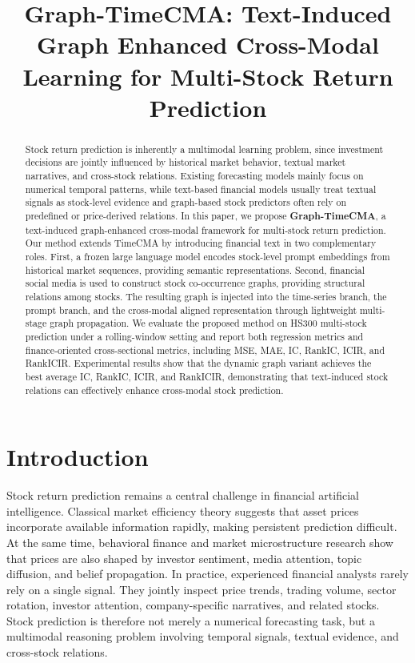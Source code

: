 \title{Graph-TimeCMA: Text-Induced Graph Enhanced Cross-Modal Learning for Multi-Stock Return Prediction}

\begin{abstract}
Stock return prediction is inherently a multimodal learning problem, since investment decisions are jointly influenced by historical market behavior, textual market narratives, and cross-stock relations. Existing forecasting models mainly focus on numerical temporal patterns, while text-based financial models usually treat textual signals as stock-level evidence and graph-based stock predictors often rely on predefined or price-derived relations. In this paper, we propose \textbf{Graph-TimeCMA}, a text-induced graph-enhanced cross-modal framework for multi-stock return prediction. Our method extends TimeCMA by introducing financial text in two complementary roles. First, a frozen large language model encodes stock-level prompt embeddings from historical market sequences, providing semantic representations. Second, financial social media is used to construct stock co-occurrence graphs, providing structural relations among stocks. The resulting graph is injected into the time-series branch, the prompt branch, and the cross-modal aligned representation through lightweight multi-stage graph propagation. We evaluate the proposed method on HS300 multi-stock prediction under a rolling-window setting and report both regression metrics and finance-oriented cross-sectional metrics, including MSE, MAE, IC, RankIC, ICIR, and RankICIR. Experimental results show that the dynamic graph variant achieves the best average IC, RankIC, ICIR, and RankICIR, demonstrating that text-induced stock relations can effectively enhance cross-modal stock prediction.
\end{abstract}

\section{Introduction}

Stock return prediction remains a central challenge in financial artificial intelligence. Classical market efficiency theory suggests that asset prices incorporate available information rapidly, making persistent prediction difficult. At the same time, behavioral finance and market microstructure research show that prices are also shaped by investor sentiment, media attention, topic diffusion, and belief propagation. In practice, experienced financial analysts rarely rely on a single signal. They jointly inspect price trends, trading volume, sector rotation, investor attention, company-specific narratives, and related stocks. Stock prediction is therefore not merely a numerical forecasting task, but a multimodal reasoning problem involving temporal signals, textual evidence, and cross-stock relations.

